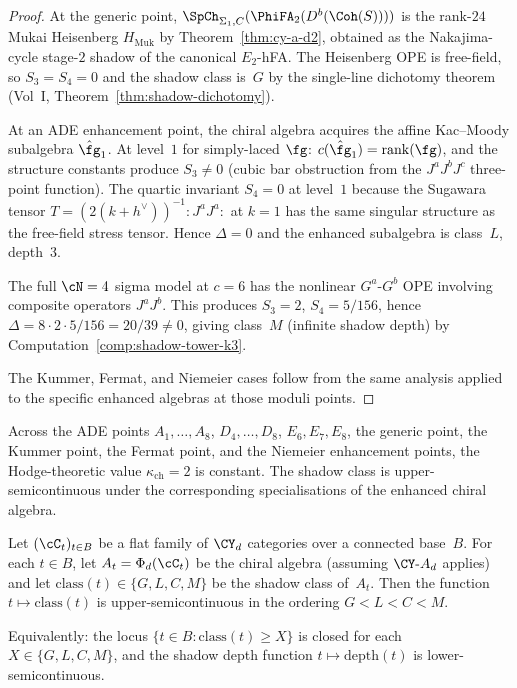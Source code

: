 \begin{proof}
At the generic point, $\SpCh_{\Sigma_1, C}(\PhiFA_2(D^b(\Coh(S))))$ is the rank-$24$ Mukai
Heisenberg $H_{\mathrm{Muk}}$ by Theorem~\ref{thm:cy-a-d2}, obtained as the Nakajima-cycle stage-$2$ shadow of the canonical $E_2$-hFA.
The Heisenberg OPE is free-field, so $S_3 = S_4 = 0$ and the shadow
class is~$G$ by the single-line dichotomy theorem (Vol~I,
Theorem~\ref{thm:shadow-dichotomy}).

At an ADE enhancement point, the chiral algebra acquires the affine
Kac--Moody subalgebra $\hat{\fg}_1$. At level~$1$ for simply-laced
$\fg$: $c(\hat{\fg}_1) = \mathrm{rank}(\fg)$, and the structure constants
produce $S_3 \neq 0$ (cubic bar obstruction from the $J^aJ^bJ^c$
three-point function). The quartic invariant $S_4 = 0$ at level~$1$
because the Sugawara tensor $T = (2(k + h^\vee))^{-1} {:}J^aJ^a{:}$ at
$k = 1$ has the same singular structure as the free-field stress tensor.
Hence $\Delta = 0$ and the enhanced subalgebra is class~$L$, depth~$3$.

The full $\cN = 4$ sigma model at $c = 6$ has the nonlinear $G^a$-$G^b$
OPE involving composite operators $J^aJ^b$. This produces
$S_3 = 2$, $S_4 = 5/156$, hence $\Delta = 8 \cdot 2 \cdot 5/156 =
20/39 \neq 0$, giving class~$M$ (infinite shadow depth) by
Computation~\ref{comp:shadow-tower-k3}.

The Kummer, Fermat, and Niemeier cases follow from the same analysis
applied to the specific enhanced algebras at those moduli points.
\end{proof}
Across the ADE points \(A_1,\ldots,A_8\), \(D_4,\ldots,D_8\),
\(E_6,E_7,E_8\), the generic point, the Kummer point, the Fermat
point, and the Niemeier enhancement points, the Hodge-theoretic value
\(\kappa_{\mathrm{ch}}=2\) is constant. The shadow class is
upper-semicontinuous under the corresponding specialisations of the
enhanced chiral algebra.

\begin{conjecture}
\label{conj:shadow-usc}
Let $(\cC_t)_{t \in B}$ be a flat family of $\CY_d$ categories over
a connected base~$B$. For each $t \in B$, let $A_t = \Phi_d(\cC_t)$
be the chiral algebra (assuming $\CY\text{-}A_d$ applies) and let
$\mathrm{class}(t) \in \{G, L, C, M\}$ be the shadow class of~$A_t$.
Then the function $t \mapsto \mathrm{class}(t)$ is
upper-semicontinuous in the ordering $G < L < C < M$.

Equivalently: the locus $\{t \in B : \mathrm{class}(t) \geq X\}$
is closed for each $X \in \{G, L, C, M\}$, and the shadow depth
function $t \mapsto \mathrm{depth}(t)$ is lower-semicontinuous.
\end{conjecture}


